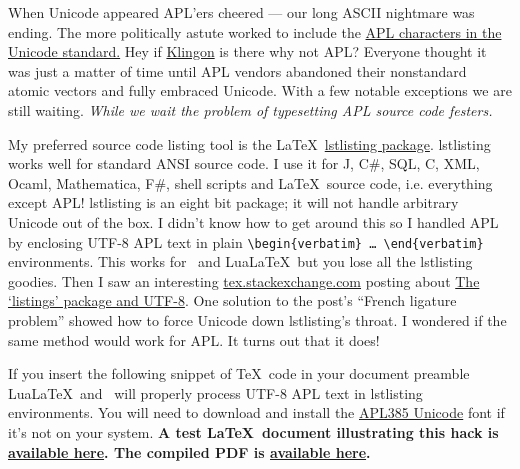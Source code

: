 

When Unicode appeared APL'ers cheered --- our long ASCII nightmare was
ending. The more politically astute worked to include the
\href{http://aplwiki.com/UnicodeForAplers}{APL characters in the Unicode
standard.} Hey if
\href{http://www.evertype.com/standards/csur/klingon.html}{Klingon} is
there why not APL? Everyone thought it was just a matter of time until
APL vendors abandoned their nonstandard atomic vectors and fully
embraced Unicode. With a few notable exceptions we are still waiting.
\emph{While we wait the problem of typesetting APL source code festers.}

My preferred source code listing tool is the \LaTeX\
\href{http://en.wikibooks.org/wiki/LaTeX/Packages/Listings}{lstlisting
package}. lstlisting works well for standard ANSI source code. I use it
for J, C\#, SQL, C, XML, Ocaml, Mathematica, F\#, shell scripts and
\LaTeX\ source code, i.e. everything except APL! lstlisting is an
eight bit package; it will not handle arbitrary Unicode out of the box.
I didn't know how to get around this so I handled APL by enclosing UTF-8
APL text in plain \texttt{\textbackslash{}begin\{verbatim\} \ldots{}
\textbackslash{}end\{verbatim\}} environments. This works for \XeLaTeX\ and
Lua\LaTeX\ but you lose all the lstlisting goodies. Then I saw an
interesting \href{http://tex.stackexchange.com/}{tex.stackexchange.com}
posting about
\href{http://tex.stackexchange.com/questions/25391/the-listings-package-and-utf-8}{The
`listings' package and UTF-8}. One solution to the post's ``French
ligature problem'' showed how to force Unicode down lstlisting's throat.
I wondered if the same method would work for APL. It turns out that it
does!

If you insert the following snippet of \TeX\ code in your document
preamble Lua\LaTeX\ and \XeLaTeX\ will properly process UTF-8 APL text in
lstlisting environments. You will need to download and install the
\href{https://github.com/bakerjd99/jacks/blob/master/latex/Apl385.ttf}{APL385 Unicode} font if it's
not on your system. \textbf{A test \LaTeX\ document illustrating
this hack is 
\href{https://github.com/bakerjd99/jacks/blob/master/latex/apl-lstlisting.tex}{available here}. The
compiled PDF is 
\href{https://github.com/bakerjd99/jacks/blob/master/latex/apl-lstlisting.pdf}{available here}.}

